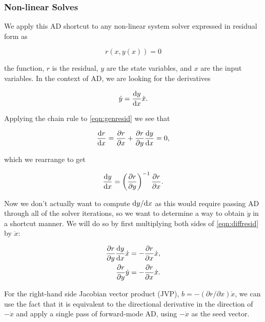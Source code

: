 \subsubsection{Non-linear Solves}

We apply this AD shortcut to any non-linear system solver expressed in residual form as

\begin{equation}
    \label{eqn:genresid}
    r(x,y(x)) = 0
\end{equation}

\where the function, \(r\) is the residual, \(y\) are the state variables, and \(x\) are the input variables.
%
In the context of AD, we are looking for the derivatives

\begin{equation}
    \dot{y} = \frac{\mathrm{d} y}{\mathrm{d} x} \dot{x}.
\end{equation}

\noindent Applying the chain rule to \cref{eqn:genresid} we see that

\begin{equation}
    \label{eqn:diffresid}
    \frac{\mathrm{d} r}{\mathrm{d} x} = \frac{\partial r}{\partial x} + \frac{\partial r}{\partial y} \frac{\mathrm{d} y}{\mathrm{d} x} = 0,
\end{equation}

\noindent which we rearrange to get

\begin{equation}
    \frac{\mathrm{d} y}{\mathrm{d} x} = \left(\frac{\partial r}{\partial y}\right)^{-1} \frac{\partial r}{\partial x}.
\end{equation}

Now we don't actually want to compute \(\mathrm{d} y/\mathrm{d} x\) as this would require passing AD through all of the solver iterations, so we want to determine a way to obtain \(\dot{y}\) in a shortcut manner.
%
We will do so by first multiplying both sides of \cref{eqn:diffresid} by \(\dot{x}\):

\begin{equation}
    \begin{aligned}
        \frac{\partial r}{\partial y}\frac{\mathrm{d} y}{\mathrm{d} x}\dot{x} &= -\frac{\partial r}{\partial x}\dot{x}, \\
        \frac{\partial r}{\partial y}\dot{y} &= -\frac{\partial r}{\partial x}\dot{x}.
    \end{aligned}
\end{equation}

\noindent For the right-hand side Jacobian vector product (JVP), \(b = -(\partial r/ \partial x) \dot{x}\), we can use the fact that it is equivalent to the directional derivative in the direction of \(-\dot{x}\) and apply a single pass of forward-mode AD, using \(-\dot{x}\) as the seed vector.

